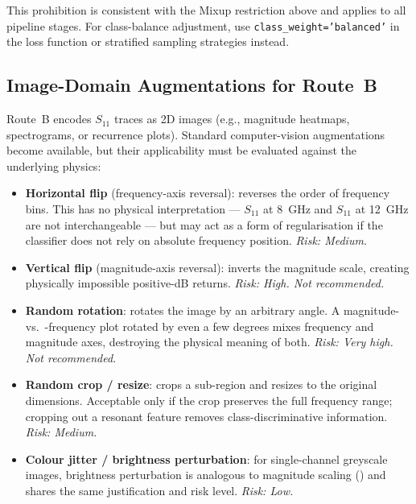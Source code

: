 This prohibition is consistent with the Mixup restriction above and
applies to all pipeline stages.  For class-balance adjustment, use
\texttt{class\_weight='balanced'} in the loss function or stratified
sampling strategies instead.

\subsection{Image-Domain Augmentations for Route~B}
\label{sec:augment:image}

Route~B encodes $S_{11}$ traces as 2D images (e.g., magnitude heatmaps,
spectrograms, or recurrence plots).  Standard computer-vision
augmentations become available, but their applicability must be evaluated
against the underlying physics:

\begin{itemize}
  \item \textbf{Horizontal flip} (frequency-axis reversal):
        reverses the order of frequency bins.  This has no physical
        interpretation — $S_{11}$ at \SI{8}{\giga\hertz} and
        $S_{11}$ at \SI{12}{\giga\hertz} are not interchangeable —
        but may act as a form of regularisation if the classifier does
        not rely on absolute frequency position.
        \emph{Risk: Medium.}

  \item \textbf{Vertical flip} (magnitude-axis reversal):
        inverts the magnitude scale, creating physically impossible
        positive-dB returns.  \emph{Risk: High.  Not recommended.}

  \item \textbf{Random rotation}:
        rotates the image by an arbitrary angle.  A magnitude-vs.\
        -frequency plot rotated by even a few degrees mixes frequency
        and magnitude axes, destroying the physical meaning of both.
        \emph{Risk: Very high.  Not recommended.}

  \item \textbf{Random crop / resize}:
        crops a sub-region and resizes to the original dimensions.
        Acceptable only if the crop preserves the full frequency range;
        cropping out a resonant feature removes class-discriminative
        information.
        \emph{Risk: Medium.}

  \item \textbf{Colour jitter / brightness perturbation}:
        for single-channel greyscale images, brightness perturbation is
        analogous to magnitude scaling (\Cref{sec:augment:magscale})
        and shares the same justification and risk level.
        \emph{Risk: Low.}
\end{itemize}

